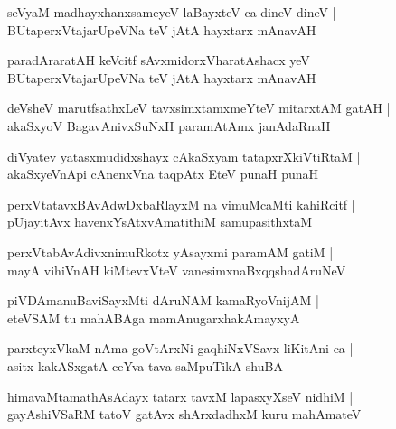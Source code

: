\documentclass[twoside,12pt,openright]{book}
\newcounter{shloka}[chapter]
\begin{document}
\begin{shloka}%
seVyaM madhayxhanxsameyeV laBayxteV ca dineV dineV |\\
BUtaperxVtajarUpeVNa teV jAtA hayxtarx mAnavAH 
\end{shloka}

\begin{shloka}%
paradAraratAH keVcitf sAvxmidorxVharatAshacx yeV |\\
BUtaperxVtajarUpeVNa teV jAtA hayxtarx mAnavAH 
\end{shloka}

\begin{shloka}%
deVsheV marutfsathxLeV tavxsimxtamxmeYteV mitarxtAM gatAH |\\
akaSxyoV BagavAnivxSuNxH paramAtAmx janAdaRnaH 
\end{shloka}

\begin{shloka}%
diVyatev yatasxmudidxshayx cAkaSxyam tatapxrXkiVtiRtaM |\\
akaSxyeVnApi cAnenxVna taqpAtx EteV punaH punaH 
\end{shloka}

\begin{shloka}%
perxVtatavxBAvAdwDxbaRlayxM na vimuMcaMti kahiRcitf |\\
pUjayitAvx havenxYsAtxvAmatithiM samupasithxtaM 
\end{shloka}

\begin{shloka}%
perxVtabAvAdivxnimuRkotx yAsayxmi paramAM gatiM |\\
mayA vihiVnAH kiMtevxVteV vanesimxnaBxqqshadAruNeV 
\end{shloka}

\begin{shloka}%
piVDAmanuBaviSayxMti dAruNAM kamaRyoVnijAM |\\
eteVSAM tu mahABAga mamAnugarxhakAmayxyA
\end{shloka}

\begin{shloka}%
parxteyxVkaM nAma goVtArxNi gaqhiNxVSavx liKitAni ca |\\
asitx kakASxgatA ceYva tava saMpuTikA shuBA
\end{shloka}

\begin{shloka}%
himavaMtamathAsAdayx tatarx tavxM lapasxyXseV nidhiM |\\
gayAshiVSaRM tatoV gatAvx shArxdadhxM kuru mahAmateV 
\end{shloka}
\end{document}
